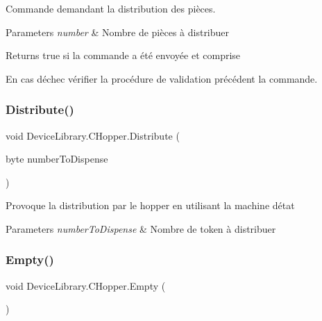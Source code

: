 Commande demandant la distribution des pièces. 


\begin{DoxyParams}{Parameters}
{\em number} & Nombre de pièces à distribuer\\
\hline
\end{DoxyParams}
\begin{DoxyReturn}{Returns}
true si la commande a été envoyée et comprise
\end{DoxyReturn}


En cas d\textquotesingle{}échec vérifier la procédure de validation précédent la commande.\mbox{\label{class_device_library_1_1_c_hopper_a1161f40b938189953cede1eb8a844672}} 
\subsubsection{\texorpdfstring{Distribute()}{Distribute()}}
{\footnotesize\ttfamily void Device\+Library.\+C\+Hopper.\+Distribute (\begin{DoxyParamCaption}\item[{byte}]{number\+To\+Dispense }\end{DoxyParamCaption})\hspace{0.3cm}{\ttfamily [inline]}}



Provoque la distribution par le hopper en utilisant la machine d\textquotesingle{}état 


\begin{DoxyParams}{Parameters}
{\em number\+To\+Dispense} & Nombre de token à distribuer\\
\hline
\end{DoxyParams}
\mbox{\label{class_device_library_1_1_c_hopper_ae47327ae35305769239ffd9922081d57}} 
\subsubsection{\texorpdfstring{Empty()}{Empty()}}
{\footnotesize\ttfamily void Device\+Library.\+C\+Hopper.\+Empty (\begin{DoxyParamCaption}{ }\end{DoxyParamCaption})\hspace{0.3cm}{\ttfamily [inline]}}




